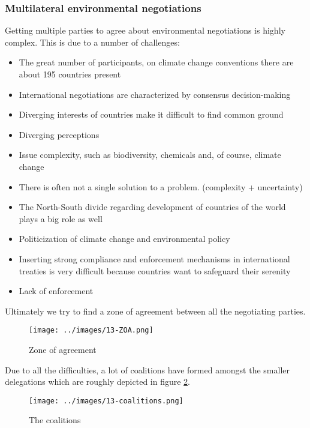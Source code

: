 \documentclass[../summary.tex]{subfiles}
\begin{document}
		\subsubsection{Multilateral environmental negotiations}
			Getting multiple parties to agree about environmental negotiations is highly complex. This is due to a number of challenges:
			\begin{itemize}
				\setlength{\itemsep}{0pt}
				\item The great number of participants, on climate change conventions there are about 195 countries present
				\item International negotiations are characterized by consensus decision-making
				\item Diverging interests of countries make it difficult to find common ground
				\item Diverging perceptions
				\item Issue complexity, such as biodiversity, chemicals and, of course, climate change
				\item There is often not a single solution to a problem. (complexity + uncertainty)
				\item The North-South divide regarding development of countries of the world plays a big role as well
				\item Politicization of climate change and environmental policy
				\item Inserting strong compliance and enforcement mechanisms in international treaties is very difficult because countries want to safeguard their serenity
				\item Lack of enforcement 
			\end{itemize}
			Ultimately we try to find a zone of agreement between all the negotiating parties. \\
			
			\begin{figure}[h]
				\centering
				\texttt{[image: ../images/13-ZOA.png]}
				\caption{Zone of agreement}
				\label{fig:13-ZOA}
			\end{figure}
			Due to all the difficulties, a lot of coalitions have formed amongst the smaller delegations which are roughly depicted in figure \ref{fig:13-coalitions}.
			\begin{figure}[h]
				\centering
				\texttt{[image: ../images/13-coalitions.png]}
				\caption{The coalitions}
				\label{fig:13-coalitions}
			\end{figure}
		
\end{document}
